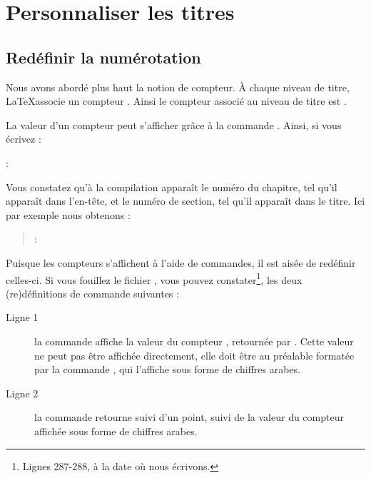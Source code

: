 \section{Personnaliser les titres}

\subsection{Redéfinir la numérotation}\label{apparencecompteur}
Nous avons abordé plus haut la notion de compteur. À chaque niveau de titre, \LaTeX associe un compteur . Ainsi le compteur associé au niveau de titre  est .

La valeur d'un compteur peut s'afficher grâce à la commande . Ainsi, si vous écrivez :
 
\begin{latexcode}
\thechapter : \thesection
\end{latexcode}

Vous constatez qu'à la compilation apparaît le numéro du chapitre, tel qu'il apparaît dans l'en-tête, et le numéro de section, tel qu'il apparaît dans le titre. Ici par exemple nous obtenons :


\begin{quotation}
\thechapter : \thesection
\end{quotation}


Puisque les compteurs s'affichent à l'aide de commandes, il est aisée de redéfinir celles-ci. Si vous fouillez le fichier , vous pouvez constater\footnote{Lignes 287-288, à la date où nous écrivons.}, les deux (re)définitions de commande suivantes :

\begin{latexcode}
\renewcommand \thechapter {\@arabic\c@chapter}
\renewcommand \thesection {\thechapter.\@arabic\c@section}
\end{latexcode}

\begin{description}
\item[Ligne 1]la commande  affiche la valeur  du compteur , retournée par . Cette valeur ne peut pas être affichée directement, elle doit être au préalable formatée par la commande , qui l'affiche sous forme de chiffres arabes.
\item[Ligne 2]la commande  retourne  suivi d'un point, suivi de la valeur du compteur  affichée sous forme de chiffres arabes.
\end{description}

